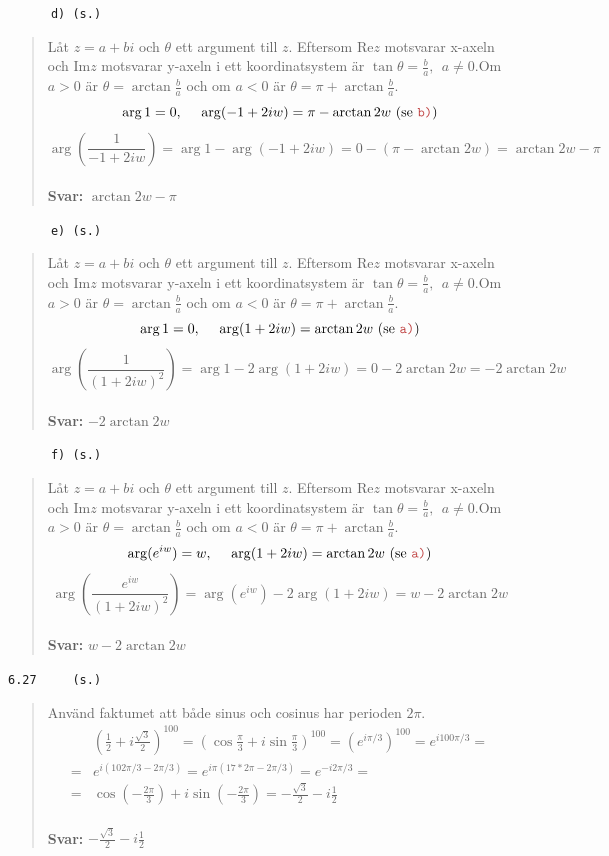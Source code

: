 \documentclass[a4paper]{article}
\newcommand{\tskcol}[1]{\textcolor{tskcol}{#1}}
\begin{document}
	\texttt{\tskcol{~~~~~~d) (s.)}}
	\begin{quotation}
		\noindent
		Låt $z=a+bi$ och $\theta$ ett argument till $z$. Eftersom Re$z$ motsvarar x-axeln och Im$z$ motsvarar y-axeln i ett koordinatsystem är $\tan\theta=\frac{b}{a},~~a\neq 0$.Om $a > 0$ är $\theta=\arctan\frac{b}{a}$ och om $a < 0$ är $\theta=\pi+\arctan\frac{b}{a}$.
		\[\arg 1 = 0,~~~~\arg(-1+2iw) = \pi-\arctan2w \text{ (se \texttt{\tskcol{b)}})}\]
		\[\arg\left(\frac{1}{-1+2iw}\right)=\arg 1 - \arg(-1+2iw)=0-(\pi-\arctan2w)=\arctan2w-\pi\]
		\\
		\textbf{Svar:} $\arctan2w-\pi$
	\end{quotation}
	
	\texttt{\tskcol{~~~~~~e) (s.)}}
	\begin{quotation}
		\noindent
		Låt $z=a+bi$ och $\theta$ ett argument till $z$. Eftersom Re$z$ motsvarar x-axeln och Im$z$ motsvarar y-axeln i ett koordinatsystem är $\tan\theta=\frac{b}{a},~~a\neq 0$.Om $a > 0$ är $\theta=\arctan\frac{b}{a}$ och om $a < 0$ är $\theta=\pi+\arctan\frac{b}{a}$.
		\[\arg 1 = 0,~~~~\arg(1+2iw) = \arctan2w \text{ (se \texttt{\tskcol{a)}})}\]
		\[\arg\left(\frac{1}{(1+2iw)^2}\right)=\arg 1 - 2\arg(1+2iw)=0-2\arctan2w=-2\arctan2w\]
		\\
		\textbf{Svar:} $-2\arctan2w$
	\end{quotation}
	
	\texttt{\tskcol{~~~~~~f) (s.)}}
	\begin{quotation}
		\noindent
		Låt $z=a+bi$ och $\theta$ ett argument till $z$. Eftersom Re$z$ motsvarar x-axeln och Im$z$ motsvarar y-axeln i ett koordinatsystem är $\tan\theta=\frac{b}{a},~~a\neq 0$.Om $a > 0$ är $\theta=\arctan\frac{b}{a}$ och om $a < 0$ är $\theta=\pi+\arctan\frac{b}{a}$.
		\[\arg(e^{iw}) = w,~~~~\arg(1+2iw) = \arctan2w \text{ (se \texttt{\tskcol{a)}})}\]
		\[\arg\left(\frac{e^{iw}}{(1+2iw)^2}\right)=\arg(e^{iw}) - 2\arg(1+2iw)=w-2\arctan2w\]
		\\
		\textbf{Svar:} $w-2\arctan2w$
	\end{quotation}
	
	\texttt{\tskcol{6.27~~~~ (s.)}}
	\begin{quotation}
		\noindent
		Använd faktumet att både sinus och cosinus har perioden $2\pi$.
		\begin{align*}
		&\left(\tfrac{1}{2}+i\tfrac{\sqrt{3}}{2}\right)^{100}=
		(\cos\tfrac{\pi}{3}+i\sin\tfrac{\pi}{3})^{100}=
		(e^{i\pi/3})^{100}=
		e^{i100\pi/3}= \\ =
		&e^{i(102\pi/3-2\pi/3)}=
		e^{i\pi(17*2\pi-2\pi/3)}=
		e^{-i2\pi/3}= \\=
		&\cos(-\tfrac{2\pi}{3})+i\sin(-\tfrac{2\pi}{3})=
		-\frac{\sqrt{3}}{2}-i\frac{1}{2}
		\end{align*}
		\\
		\textbf{Svar:} $-\frac{\sqrt{3}}{2}-i\frac{1}{2}$
	\end{quotation}
	
\end{document}
